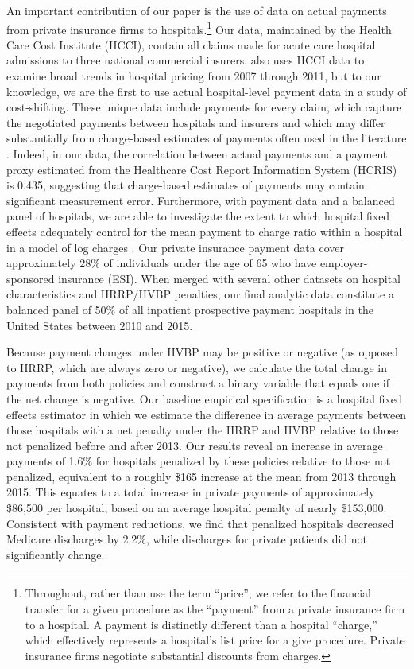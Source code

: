 \documentclass[12pt]{article}
\begin{document}
An important contribution of our paper is the use of data on actual payments from private insurance firms to hospitals.\footnote{Throughout, rather than use the term ``price'', we refer to the financial transfer for a given procedure as the ``payment'' from a private insurance firm to a hospital.  A payment is distinctly different than a hospital ``charge,'' which effectively represents a hospital's list price for a give procedure. Private insurance firms negotiate substantial discounts from charges.}  Our data, maintained by the Health Care Cost Institute (HCCI), contain all claims made for acute care hospital admissions to three national commercial insurers. \cite{cooper2015} also uses HCCI data to examine broad trends in hospital pricing from 2007 through 2011, but to our knowledge, we are the first to use actual hospital-level payment data in a study of cost-shifting. These unique data include payments for every claim, which capture the negotiated payments between hospitals and insurers and which may differ substantially from charge-based estimates of payments often used in the literature \citep{dafny2009,dranove2017}. Indeed, in our data, the correlation between actual payments and a payment proxy estimated from the Healthcare Cost Report Information System (HCRIS) is 0.435, suggesting that charge-based estimates of payments may contain significant measurement error.  Furthermore, with payment data and a balanced panel of hospitals, we are able to investigate the extent to which hospital fixed effects adequately control for the mean payment to charge ratio within a hospital in a model of log charges \citep{cutler2000}. Our private insurance payment data cover approximately 28\% of individuals under the age of 65 who have employer-sponsored insurance (ESI). When merged with several other datasets on hospital characteristics and HRRP/HVBP penalties, our final analytic data constitute a balanced panel of 50\% of all inpatient prospective payment hospitals in the United States between 2010 and 2015.

Because payment changes under HVBP may be positive or negative (as opposed to HRRP, which are always zero or negative), we calculate the total change in payments from both policies and construct a binary variable that equals one if the net change is negative.  Our baseline empirical specification is a hospital fixed effects estimator in which we estimate the difference in average payments between those hospitals with a net penalty under the HRRP and HVBP relative to those not penalized before and after 2013. Our results reveal an increase in average payments of 1.6\% for hospitals penalized by these policies relative to those not penalized, equivalent to a roughly \$165 increase at the mean from 2013 through 2015. This equates to a total increase in private payments of approximately \$86,500 per hospital, based on an average hospital penalty of nearly \$153,000. Consistent with payment reductions, we find that penalized hospitals decreased Medicare discharges by 2.2\%, while discharges for private patients did not significantly change.
\end{document}
